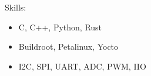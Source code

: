 \noindent Skills:
\begin{itemize}[itemsep=-0.5em]
    \item C, C++, Python, Rust
    \item Buildroot, Petalinux, Yocto
    \item I2C, SPI, UART, ADC, PWM, IIO
\end{itemize}
